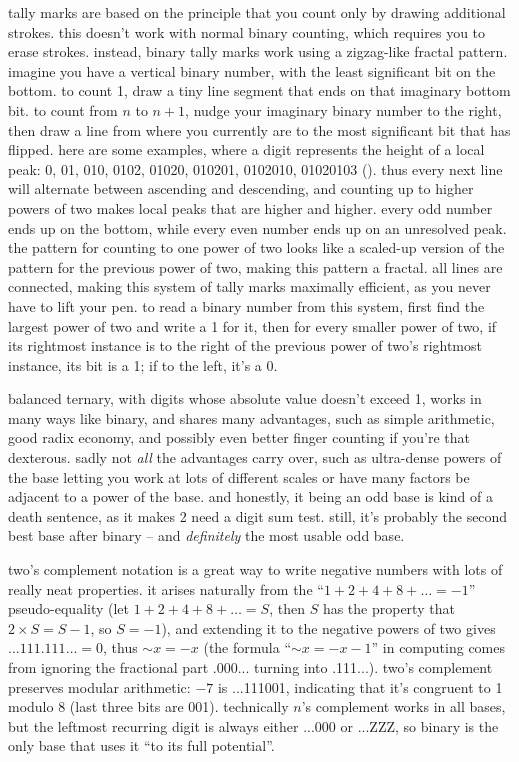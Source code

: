 \documentclass[../footnotes.tex]{subfiles}
\begin{document}

\myfootnote{} tally marks are based on the principle that you count only by drawing additional strokes. this doesn't work with normal binary counting, which requires you to erase strokes. instead, binary tally marks work using a zigzag-like fractal pattern. imagine you have a vertical binary number, with the least significant bit on the bottom. to count 1, draw a tiny line segment that ends on that imaginary bottom bit. to count from $n$ to $n + 1$, nudge your imaginary binary number to the right, then draw a line from where you currently are to the most significant bit that has flipped. here are some examples, where a digit represents the height of a local peak: 0, 01, 010, 0102, 01020, 010201, 0102010, 01020103 (). thus every next line will alternate between ascending and descending, and counting up to higher powers of two makes local peaks that are higher and higher. every odd number ends up on the bottom, while every even number ends up on an unresolved peak. the pattern for counting to one power of two looks like a scaled-up version of the pattern for the previous power of two, making this pattern a fractal. all lines are connected, making this system of tally marks maximally efficient, as you never have to lift your pen. to read a binary number from this system, first find the largest power of two and write a 1 for it, then for every smaller power of two, if its rightmost instance is to the right of the previous power of two's rightmost instance, its bit is a 1; if to the left, it's a 0.

\myfootnote{} balanced ternary, with digits whose absolute value doesn't exceed 1, works in many ways like binary, and shares many advantages, such as simple arithmetic, good radix economy, and possibly even better finger counting if you're that dexterous. sadly not \emph{all} the advantages carry over, such as ultra-dense powers of the base letting you work at lots of different scales or have many factors be adjacent to a power of the base. and honestly, it being an odd base is kind of a death sentence, as it makes 2 need a digit sum test. still, it's probably the second best base after binary -- and \emph{definitely} the most usable odd base.

\myfootnote{} two's complement notation is a great way to write negative numbers with lots of really neat properties. it arises naturally from the ``$1 + 2 + 4 + 8 + \ldots = -1$'' pseudo-equality (let $1 + 2 + 4 + 8 + \ldots = S$, then $S$ has the property that $2 \times S = S - 1$, so $S = -1$), and extending it to the negative powers of two gives $\ldots 111.111 \ldots = 0$, thus $\mathord{\sim}x = -x$ (the formula ``$\mathord{\sim}x = -x - 1$'' in computing comes from ignoring the fractional part .000... turning into .111...). two's complement preserves modular arithmetic: $-7$ is ...111001, indicating that it's congruent to 1 modulo 8 (last three bits are 001). technically $n$'s complement works in all bases, but the leftmost recurring digit is always either ...000 or ...ZZZ, so binary is the only base that uses it ``to its full potential''.
\end{document}
